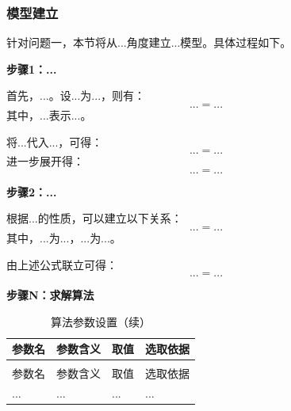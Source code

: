
\subsubsection{模型建立}

针对问题一，本节将从...角度建立...模型。具体过程如下。

\textbf{步骤1：...}

首先，...。设...为...，则有：
\begin{equation}
    ... = ...
\end{equation}
其中，$...$表示...。

将...代入...，可得：
\begin{equation}
    ... = ...
\end{equation}
进一步展开得：
\begin{equation}
    ... = ...
\end{equation}

\textbf{步骤2：...}

根据...的性质，可以建立以下关系：
\begin{equation}
    ... = ...
\end{equation}
其中，$...$为...，$...$为...。

由上述公式联立可得：
\begin{equation}
    ... = ...
\end{equation}


\textbf{步骤N：求解算法}

\begin{longtable}{>{\centering\arraybackslash}p{}>{\centering\arraybackslash}p{}>{\centering\arraybackslash}p{}>{\centering\arraybackslash}p{}}
  \caption{算法参数设置}
  \label{tab:参数1} \\
  \toprule
  参数名 & 参数含义 & 取值 & 选取依据 \\
  \midrule
  \endfirsthead
  \caption{算法参数设置（续）} \\
  \toprule
  参数名 & 参数含义 & 取值 & 选取依据 \\
  \midrule
  \endhead
  \bottomrule
  \endfoot
  ... & ... & ... & ... \\
\end{longtable}

